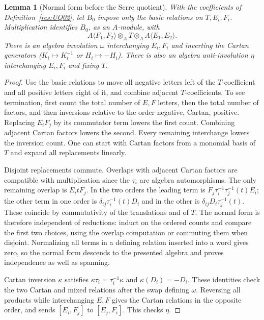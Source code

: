 \documentclass[11pt,oneside,openany]{book}
\newtheorem{lemma}[theorem]{Lemma}
\theoremstyle{definition}
\theoremstyle{remark}
\begin{document}
\begin{lemma}[Normal form before the Serre quotient]
\label{res:UQ03}
With the coefficients of Definition~\ref{res:UQ02},
let \(B_0\) impose only the basic relations on \(T,E_i,F_i\).
Multiplication identifies \(B_0\), as an \(A\)-module, with
\[
 A\langle F_1,F_2\rangle\otimes_A T
       \otimes_A A\langle E_1,E_2\rangle .
\]
There is an algebra involution \(\omega\) interchanging
\(E_i,F_i\) and inverting the Cartan generators
(\(K_i\mapsto K_i^{-1}\) or \(H_i\mapsto-H_i\)).
There is also an algebra anti-involution \(\eta\) interchanging
\(E_i,F_i\) and fixing \(T\).
\end{lemma}
\begin{proof}
Use the basic relations to move all negative letters left of
the \(T\)-coefficient and all positive letters right of it,
and combine adjacent \(T\)-coefficients. To see termination,
first count the total number of \(E,F\) letters, then the
total number of factors, and then inversions relative to the
order negative, Cartan, positive. Replacing \(E_iF_j\) by its
commutator term lowers the first count. Combining adjacent
Cartan factors lowers the second. Every remaining interchange
lowers the inversion count. One can start with Cartan factors
from a monomial basis of \(T\) and expand all replacements
linearly.

Disjoint replacements commute. Overlaps with adjacent
Cartan factors are compatible with multiplication since the
\(\tau_i\) are algebra automorphisms. The only remaining
overlap is \(E_i tF_j\). In the two orders the leading term
is \(F_j\tau_i^{-1}\tau_j^{-1}(t)E_i\); the other term in
one order is \(\delta_{ij}\tau_i^{-1}(t)D_i\) and in
the other is \(\delta_{ij}D_i\tau_j^{-1}(t)\).
These coincide by commutativity of the translations and
of \(T\). The normal form is therefore independent of reductions:
induct on the ordered counts and compare the first two choices,
using the overlap computation or commuting them when disjoint.
Normalizing all terms in a defining relation inserted into
a word gives zero, so the normal form descends to the
presented algebra and proves independence as well as spanning.

Cartan inversion \(\kappa\) satisfies
\(\kappa\tau_i=\tau_i^{-1}\kappa\) and \(\kappa(D_i)=-D_i\).
These identities check the two Cartan and mixed relations
after the swap defining \(\omega\). Reversing all products
while interchanging \(E,F\) gives the Cartan relations in
the opposite order, and sends
\([E_i,F_j]\) to \([E_j,F_i]\). This checks \(\eta\).
\end{proof}
\end{document}
